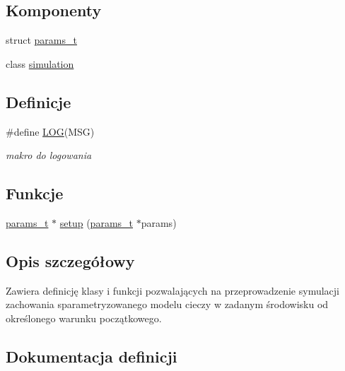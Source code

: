 \subsection*{Komponenty}
\begin{DoxyCompactItemize}
\item 
struct \hyperlink{structparams__t}{params\+\_\+t}
\item 
class \hyperlink{classsimulation}{simulation}
\end{DoxyCompactItemize}
\subsection*{Definicje}
\begin{DoxyCompactItemize}
\item 
\#define \hyperlink{simulation_8hh_acbd91a8a9a62657e2252a0a1f7c876e1}{L\+O\+G}(M\+S\+G)
\begin{DoxyCompactList}\small\item\em makro do logowania \end{DoxyCompactList}\end{DoxyCompactItemize}
\subsection*{Funkcje}
\begin{DoxyCompactItemize}
\item 
\hyperlink{structparams__t}{params\+\_\+t} $\ast$ \hyperlink{simulation_8hh_abf5adaaaf59fb394dd7b3c5d4bcaaa1a}{setup} (\hyperlink{structparams__t}{params\+\_\+t} $\ast$params)
\end{DoxyCompactItemize}


\subsection{Opis szczegółowy}
Zawiera definicję klasy i funkcji pozwalających na przeprowadzenie symulacji zachowania sparametryzowanego modelu cieczy w zadanym środowisku od określonego warunku początkowego. 

\subsection{Dokumentacja definicji}
\hypertarget{simulation_8hh_acbd91a8a9a62657e2252a0a1f7c876e1}{}
